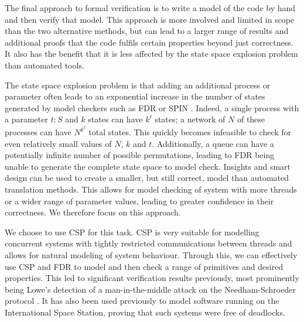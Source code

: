 The final approach to formal verification is to write a model of the code by hand and then verify that model. This approach is more involved and limited in scope than the two alternative methods, but can lead to a larger range of results and additional proofs that the code fulfils certain properties beyond just correctness. It also has the benefit that it is less affected by the state space explosion problem than automated tools. 

The state space explosion problem is that adding an additional process or parameter often leads to an exponential increase in the number of states generated by model checkers such as FDR or SPIN \cite{RoscoeUCS}. Indeed, a single process with a parameter $t : S$ and $k$ states  can have $k^{t}$ states; a network of $N$ of these processes can have $N^{k^{t}}$ total states. This quickly becomes infeasible to check for even relatively small values of $N$, $k$ and $t$. Additionally, a queue can have a potentially infinite number of possible permutations, leading to FDR being unable to generate the complete state space to model check. Insights and smart design can be used to create a smaller, but still correct, model than automated translation methods. This allows for model checking of system with more threads or a wider range of parameter values, leading to greater confidence in their correctness. We therefore focus on this approach.




We choose to use CSP for this task. CSP is very suitable for modelling concurrent systems with tightly restricted communications between threads \cite{Lawrence2005} and allows for natural modeling of system behaviour. Through this, we can effectively use CSP and FDR to model and then check a range of primitives and desired properties. This led to significant verification results previously, most prominently being Lowe's detection of a man-in-the-middle attack on the Needham-Schroeder protocol \cite{LoweNeedham}. It has also been used previously to model software running on the International Space Station, proving that such systems were free of deadlocks\cite{DeadlockAnalysis}. 

